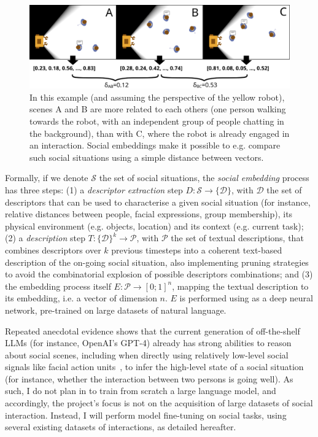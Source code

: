 \begin{figure}[H]
    \centering
    \includegraphics[width=0.9\linewidth]{figs/social-embeddings}
    \caption{In this example (and assuming the perspective of the yellow
    robot), scenes A and B  are more related to each others (one person
    walking towards the robot, with an independent group of people chatting
    in the background), than with C, where the robot is already engaged in
    an interaction.  Social embeddings make it possible to e.g. compare such
    social situations using a simple distance between vectors.}

    \label{fig:social-embeddings}
\end{figure}


Formally, if we denote $\mathcal{S}$ the set of social situations, the
\emph{social embedding} process has three steps: (1) a \emph{descriptor
extraction} step $D : \mathcal{S} \to \{\mathcal{D}\}$, with $\mathcal{D}$ the
set of descriptors that can be used to characterise a given social situation
(for instance, relative distances between people, facial expressions, group
membership), its physical environment (e.g. objects, location) and its context
(e.g. current task); (2) a \emph{description} step $T: \{\mathcal{D}\}^k \to
\mathcal{P}$, with $\mathcal{P}$ the set of textual descriptions, that combines
descriptors over $k$ previous timesteps into a coherent text-based description
of the on-going social situation, also implementing pruning strategies to avoid
the combinatorial explosion of possible descriptors combinations; and (3) the
embedding process itself $E : \mathcal{P} \to [0;1]^n$, mapping the textual
description to its embedding, i.e.  a vector of dimension $n$. $E$ is
performed using as a deep neural network, pre-trained on large datasets of natural
language.

Repeated anecdotal evidence shows that the current generation of off-the-shelf
LLMs (for instance, OpenAI's GPT-4) already has strong abilities to reason about
social scenes, including when directly using relatively low-level social signals
like facial action units~\cite{paul2005what}, to infer the high-level state of
a social situation (for instance, whether the interaction between two persons is
going well). As such, I do not plan in \project to train from scratch a large
language model, and accordingly, the project's focus is not on the acquisition
of large datasets of social interaction. Instead, I will perform model
fine-tuning on social tasks, using several existing datasets of interactions, as
detailed hereafter.

